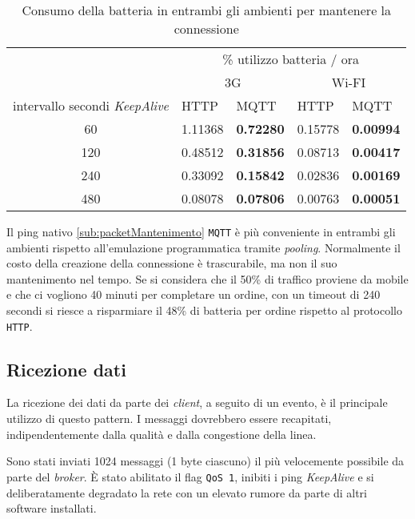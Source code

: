 \begin{table}[H]
  \begin{center}
  \begin{tabular}{| c | l | l | l | l |}
    \hline
     & \multicolumn{4}{|c|}{\% utilizzo batteria / ora} \\ \cline{2-5}
     & \multicolumn{2}{|c|}{3G} & \multicolumn{2}{|c|}{Wi-FI} \\ \hline
    intervallo secondi \textit{KeepAlive} & HTTP & MQTT & HTTP & MQTT \\ \hline
    60  & 1.11368 & \textbf{0.72280} & 0.15778 & \textbf{0.00994} \\ \hline
    120 & 0.48512 & \textbf{0.31856} & 0.08713 & \textbf{0.00417} \\ \hline
    240 & 0.33092 & \textbf{0.15842} & 0.02836 & \textbf{0.00169} \\ \hline
    480 & 0.08078 & \textbf{0.07806} & 0.00763 & \textbf{0.00051} \\ \hline
  \end{tabular}
  \label{tab:comparisonMantenimento}
  \caption{Consumo della batteria in entrambi gli ambienti per mantenere la connessione}
  \end{center}
\end{table}

Il ping nativo \ref{sub:packetMantenimento} \verb+MQTT+ è più conveniente in entrambi gli ambienti rispetto all'emulazione programmatica tramite \textit{pooling}.
Normalmente il costo della creazione della connessione è trascurabile, ma non il suo mantenimento nel tempo.
Se si considera che il 50\% di traffico proviene da mobile e che ci vogliono 40 minuti per completare un ordine, con un timeout di 240 secondi si riesce a risparmiare il 48\% di batteria per ordine rispetto al protocollo \verb+HTTP+.

\subsection{Ricezione dati}
\label{sub:comparisonRicezione}

La ricezione dei dati da parte dei \textit{client}, a seguito di un evento, è il principale utilizzo di questo pattern.
I messaggi dovrebbero essere recapitati, indipendentemente dalla qualità e dalla congestione della linea.

Sono stati inviati 1024 messaggi (1 byte ciascuno) il più velocemente possibile da parte del \textit{broker}.
È stato abilitato il flag \verb+QoS 1+, inibiti i ping \textit{KeepAlive} e si deliberatamente degradato la rete con un elevato rumore da parte di altri software installati.

